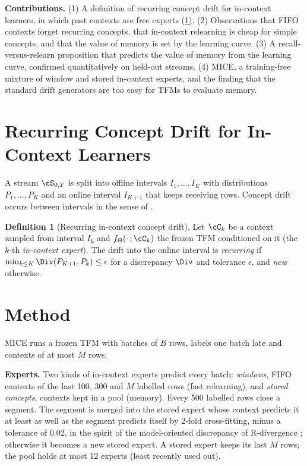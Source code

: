 \documentclass{article}
\theoremstyle{plain}
\theoremstyle{definition}
\newtheorem{definition}{Definition}
\theoremstyle{remark}
\newcommand{\method}{\textsc{MICE}}   %
\begin{document}
\textbf{Contributions.}
(1) A definition of recurring concept drift for in-context learners, in which past contexts are free experts
(\cref{def:recur}).
(2) Observations that FIFO contexts forget recurring concepts, that in-context relearning is cheap for simple
concepts, and that the value of memory is set by the learning curve.
(3) A recall-versus-relearn proposition that predicts the value of memory from the learning curve, confirmed
quantitatively on held-out streams.
(4) \method{}, a training-free mixture of window and stored in-context experts, and the finding that the standard
drift generators are too easy for TFMs to evaluate memory.

\section{Recurring Concept Drift for In-Context Learners}
\label{sec:def}

A stream $\cS_{0,T}$ is split into offline intervals $I_1,\dots,I_K$ with distributions $P_1,\dots,P_K$ and an
online interval $I_{K+1}$ that keeps receiving rows. Concept drift occurs between intervals in the sense of
\citet{lu2019learning}.

\begin{definition}[Recurring in-context concept drift]\label{def:recur}
Let $\cC_k$ be a context sampled from interval $I_k$ and $f_{\Theta}(\cdot\,;\cC_k)$ the frozen TFM conditioned on it
(the $k$-th \emph{in-context expert}). The drift into the online interval is \emph{recurring} if
$\min_{k\le K}\Div(P_{K+1},P_k)\le\epsilon$ for a discrepancy $\Div$ and tolerance $\epsilon$, and \emph{new} otherwise.
\end{definition}


\section{Method}
\label{sec:method}

\method{} runs a frozen TFM with batches of $B$ rows, labels one batch late and contexts of at most $M$ rows.

\textbf{Experts.} Two kinds of in-context experts predict every batch: \emph{windows}, FIFO contexts of the last 100,
300 and $M$ labelled rows (fast relearning), and \emph{stored concepts}, contexts kept in a pool (memory). Every 500
labelled rows close a segment. The segment is merged into the stored expert whose context predicts it at least as well
as the segment predicts itself by 2-fold cross-fitting, minus a tolerance of 0.02, in the spirit of the
model-oriented discrepancy of R-divergence \citep{zhao2023rdiv}; otherwise it becomes a new stored expert. A stored
expert keeps its last $M$ rows; the pool holds at most 12 experts (least recently used out).
\end{document}
